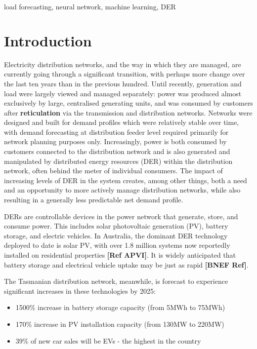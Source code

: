 \documentclass[conference]{IEEEtran}
\begin{document}
\begin{IEEEkeywords}
load forecasting, neural network, machine learning, DER
\end{IEEEkeywords}

\section{Introduction}
Electricity distribution networks, and the way in which they are managed, are currently going through a significant transition, with perhaps more change over the last ten years than in the previous hundred. %
Until recently, generation and load were largely viewed and managed separately: power was produced almost exclusively by large, centralised generating units, and was consumed by customers after \textbf{reticulation} via %
the transmission and distribution networks. 
Networks were designed and built for demand profiles which were relatively stable over time, with demand forecasting at distribution feeder level required primarily for network planning purposes only. 
Increasingly, power is both consumed by customers connected to the distribution network and is also generated and manipulated by distributed energy resources (DER) within the distribution network, often behind the meter of individual consumers. 
The impact of increasing levels of DER in the system creates, among other things, both a need and an opportunity to more actively manage distribution networks, while also resulting in a generally less predictable net demand profile.

DERs are controllable devices in the power network that generate, store, and consume power. 
This includes solar photovoltaic generation (PV), battery storage, and electric vehicles. 
In Australia, the dominant DER technology deployed to date is solar PV, with over 1.8 million systems now reportedly installed on residential properties \textbf{[Ref APVI]}. 
It is widely anticipated that battery storage and electrical vehicle uptake may be just as rapid \textbf{[BNEF Ref]}.

The Tasmanian distribution network, meanwhile, is forecast to experience significant increases in these technologies by 2025: \\
\begin{itemize}
	\item 1500\% increase in battery storage capacity (from 5MWh to 75MWh) \cite{Jacobs2017}
	\item 170\% increase in PV installation capacity (from 130MW to 220MW) \cite{Jacobs2017}
	\item 39\% of new car sales will be EVs - the highest in the country \cite{AEMO2016}
\end{itemize}
\end{document}
